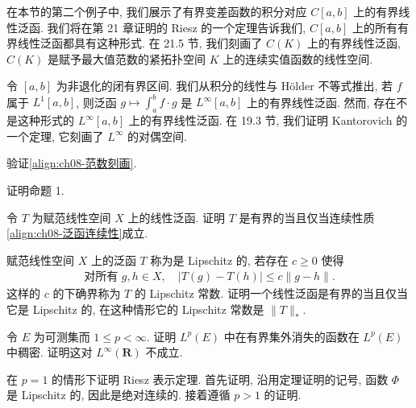 \documentclass[../../main.tex]{subfiles}
\begin{document}
\begin{remark}\label{remark:ch08-Riesz区间注记}
在本节的第二个例子中, 我们展示了有界变差函数的积分对应 $C[a,b]$ 上的有界线性泛函. 我们将在第 21 章证明的 Riesz 的一个定理告诉我们, $C[a,b]$ 上的所有有界线性泛函都具有这种形式. 在 21.5 节, 我们刻画了 $C(K)$ 上的有界线性泛函, $C(K)$ 是赋予最大值范数的紧拓扑空间 $K$ 上的连续实值函数的线性空间.
\end{remark}

\begin{remark}\label{remark:ch08-Linfty对偶注记}
令 $[a,b]$ 为非退化的闭有界区间. 我们从积分的线性与 H\"older 不等式推出, 若 $f$ 属于 $L^{1}[a,b]$, 则泛函 $g\mapsto\int_{a}^{b}f\cdot g$ 是 $L^{\infty}[a,b]$ 上的有界线性泛函. 然而, 存在不是这种形式的 $L^{\infty}[a,b]$ 上的有界线性泛函. 在 19.3 节, 我们证明 Kantorovich 的一个定理, 它刻画了 $L^{\infty}$ 的对偶空间.
\end{remark}

\begin{exercise}\label{exercise:ch08-01}
验证\eqref{align:ch08-范数刻画}.
\end{exercise}

\begin{exercise}\label{exercise:ch08-02}
证明命题 1.
\end{exercise}

\begin{exercise}\label{exercise:ch08-03}
令 $T$ 为赋范线性空间 $X$ 上的线性泛函. 证明 $T$ 是有界的当且仅当连续性质\eqref{align:ch08-泛函连续性}成立.
\end{exercise}

\begin{exercise}\label{exercise:ch08-04}
赋范线性空间 $X$ 上的泛函 $T$ 称为是 Lipschitz 的, 若存在 $c\geqslant 0$ 使得
\begin{align*}
\text{对所有 }g,h\in X,\quad|T(g)-T(h)|\leqslant c\|g-h\|.
\end{align*}
这样的 $c$ 的下确界称为 $T$ 的 Lipschitz 常数. 证明一个线性泛函是有界的当且仅当它是 Lipschitz 的, 在这种情形它的 Lipschitz 常数是 $\|T\|_{*}$.
\end{exercise}

\begin{exercise}\label{exercise:ch08-05}
令 $E$ 为可测集而 $1\leqslant p<\infty$. 证明 $L^{p}(E)$ 中在有界集外消失的函数在 $L^{p}(E)$ 中稠密. 证明这对 $L^{\infty}(\mathbf{R})$ 不成立.
\end{exercise}

\begin{exercise}\label{exercise:ch08-06}
在 $p=1$ 的情形下证明 Riesz 表示定理. 首先证明, 沿用定理证明的记号, 函数 $\Phi$ 是 Lipschitz 的, 因此是绝对连续的. 接着遵循 $p>1$ 的证明.
\end{exercise}
\end{document}
